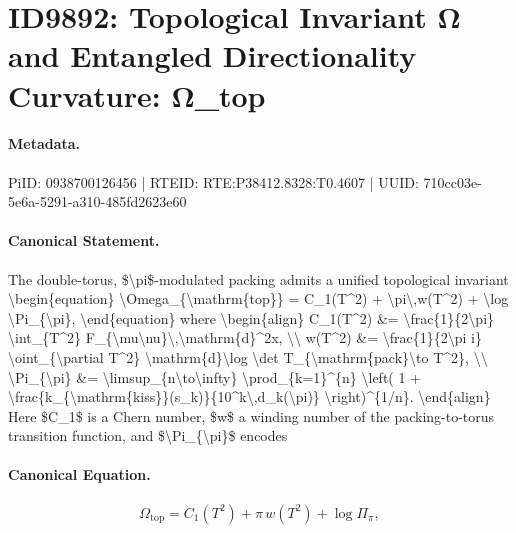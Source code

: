 \section*{ID9892: Topological Invariant Ω and Entangled Directionality Curvature: Ω\_top}
\paragraph{Metadata.}
PiID: 0938700126456 | RTEID: RTE:P38412.8328:T0.4607 | UUID: 710cc03e-5e6a-5291-a310-485fd2623e60

\paragraph{Canonical Statement.}
The double-torus, \$\textbackslash{}pi\$-modulated packing admits a unified topological invariant \textbackslash{}begin\{equation\} \textbackslash{}Omega\_\{\textbackslash{}mathrm\{top\}\} = C\_1(T\textasciicircum{}2) + \textbackslash{}pi\textbackslash{},w(T\textasciicircum{}2) + \textbackslash{}log \textbackslash{}Pi\_\{\textbackslash{}pi\}, \textbackslash{}end\{equation\} where \textbackslash{}begin\{align\} C\_1(T\textasciicircum{}2) \&= \textbackslash{}frac\{1\}\{2\textbackslash{}pi\} \textbackslash{}int\_\{T\textasciicircum{}2\} F\_\{\textbackslash{}mu\textbackslash{}nu\}\textbackslash{},\textbackslash{}mathrm\{d\}\textasciicircum{}2x, \textbackslash{}\textbackslash{} w(T\textasciicircum{}2) \&= \textbackslash{}frac\{1\}\{2\textbackslash{}pi i\} \textbackslash{}oint\_\{\textbackslash{}partial T\textasciicircum{}2\} \textbackslash{}mathrm\{d\}\textbackslash{}log \textbackslash{}det T\_\{\textbackslash{}mathrm\{pack\}\textbackslash{}to T\textasciicircum{}2\}, \textbackslash{}\textbackslash{} \textbackslash{}Pi\_\{\textbackslash{}pi\} \&= \textbackslash{}limsup\_\{n\textbackslash{}to\textbackslash{}infty\} \textbackslash{}prod\_\{k=1\}\textasciicircum{}\{n\} \textbackslash{}left( 1 + \textbackslash{}frac\{k\_\{\textbackslash{}mathrm\{kiss\}\}(s\_k)\}\{10\textasciicircum{}k\textbackslash{},d\_k(\textbackslash{}pi)\} \textbackslash{}right)\textasciicircum{}\{1/n\}. \textbackslash{}end\{align\} Here \$C\_1\$ is a Chern number, \$w\$ a winding number of the packing-to-torus transition function, and \$\textbackslash{}Pi\_\{\textbackslash{}pi\}\$ encodes

\paragraph{Canonical Equation.}
\[
\Omega_{\mathrm{top}} = C_1(T^2) + \pi\,w(T^2) + \log \Pi_{\pi},
\]

